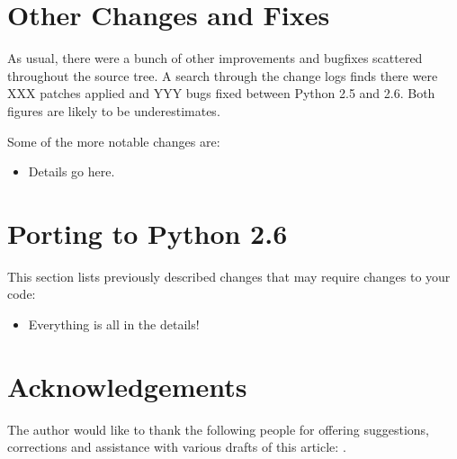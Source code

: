 \documentclass{howto}
\begin{document}
\section{Other Changes and Fixes \label{section-other}}

As usual, there were a bunch of other improvements and bugfixes
scattered throughout the source tree.  A search through the change
logs finds there were XXX patches applied and YYY bugs fixed between
Python 2.5 and 2.6.  Both figures are likely to be underestimates.

Some of the more notable changes are:

\begin{itemize}

\item Details go here.

\end{itemize}


\section{Porting to Python 2.6}

This section lists previously described changes that may require
changes to your code:

\begin{itemize}

\item Everything is all in the details!

\end{itemize}


\section{Acknowledgements \label{acks}}

The author would like to thank the following people for offering
suggestions, corrections and assistance with various drafts of this
article: .
\end{document}
